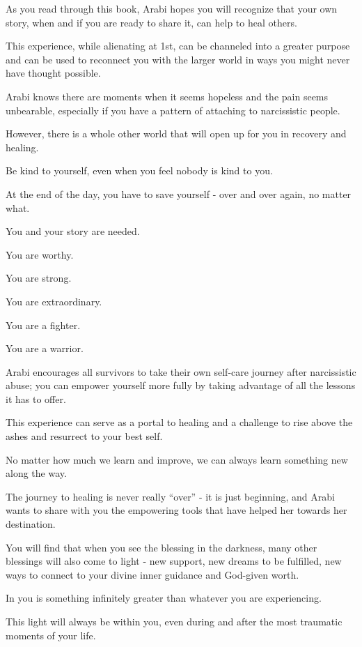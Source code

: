\documentclass[oneside]{book}
\numberwithin{equation}{section}
\begin{document}
%
As you read through this book, Arabi hopes you will recognize that your own story, when and if you are ready to share it, can help to heal others.

This experience, while alienating at 1st, can be channeled into a greater purpose and can be used to reconnect you with the larger world in ways you might never have thought possible.

Arabi knows there are moments when it seems hopeless and the pain seems unbearable, especially if you have a pattern of attaching to narcissistic people.

%
However, there is a whole other world that will open up for you in recovery and healing.

Be kind to yourself, even when you feel nobody is kind to you.

At the end of the day, you have to save yourself - over and over again, no matter what.

You and your story are needed.

You are worthy.

You are strong.

You are extraordinary.

You are a fighter.

You are a warrior.

%
Arabi encourages all survivors to take their own self-care journey after narcissistic abuse; you can empower yourself more fully by taking advantage of all the lessons it has to offer.

This experience can serve as a portal to healing and a challenge to rise above the ashes and resurrect to your best self.

%
No matter how much we learn and improve, we can always learn something new along the way.

The journey to healing is never really ``over'' - it is just beginning, and Arabi wants to share with you the empowering tools that have helped her towards her destination.

%
You will find that when you see the blessing in the darkness, many other blessings will also come to light - new support, new dreams to be fulfilled, new ways to connect to your divine inner guidance and God-given worth.

In you is something infinitely greater than whatever you are experiencing.

This light will always be within you, even during and after the most traumatic moments of your life.
\end{document}
